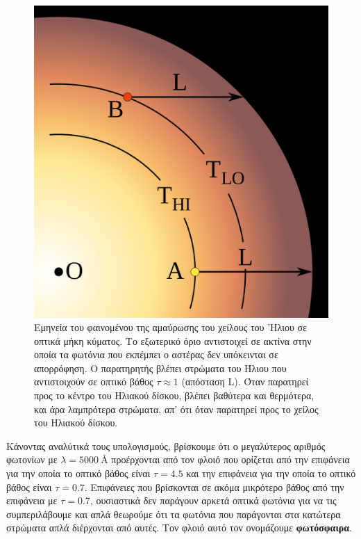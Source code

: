 \begin{figure}[h]
    \centering
    \includegraphics[scale=0.08]{Figures/limb_darkening.png}
    \caption{Εμηνεία του φαινομένου της αμαύρωσης του χείλους του 'Ηλιου σε οπτικά μήκη κύματος. Το εξωτερικό όριο αντιστοιχεί σε ακτίνα στην οποία τα φωτόνια που εκπέμπει ο αστέρας δεν υπόκεινται σε απορρόφηση. Ο παρατηρητής βλέπει στρώματα του Ήλιου που αντιστοιχούν σε οπτικό βάθος $\tau \approx 1$ (απόσταση L). Όταν παρατηρεί προς το κέντρο του Ηλιακού δίσκου, βλέπει βαθύτερα και θερμότερα, και άρα λαμπρότερα στρώματα, απ' ότι όταν παρατηρεί προς το χείλος του Ηλιακού δίσκου.}
    \label{fig:limb_darkening}
\end{figure}

Κάνοντας αναλύτικά τους υπολογισμούς, βρίσκουμε ότι ο μεγαλύτερος αριθμός φωτονίων με $\lambda = 5000 \ \text{\AA}$ προέρχονται από τον φλοιό που ορίζεται από την επιφάνεια για την οποία το οπτικό βάθος είναι $\tau = 4.5$ και την επιφάνεια για την οποία το οπτικό βάθος είναι $\tau = 0.7$. Επιφάνειες που βρίσκονται σε ακόμα μικρότερο βάθος από την επιφάνεια με $\tau = 0.7$, ουσιαστικά δεν παράγουν αρκετά οπτικά φωτόνια για να τις συμπεριλάβουμε και απλά θεωρούμε ότι τα φωτόνια που παράγονται στα κατώτερα στρώματα απλά διέρχονται από αυτές. Τον φλοιό αυτό τον ονομάζουμε \textbf{φωτόσφαιρα}.

